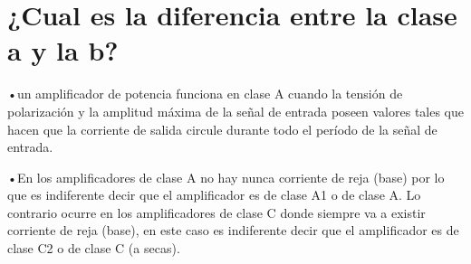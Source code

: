 \documentclass[12pt,a4paper]{article}
\begin{document}
\chapter{¿Cual es la diferencia entre la clase  a y la b?}
\begin{flushleft}
•un amplificador de potencia funciona en clase A cuando la tensión de polarización y la amplitud máxima de la señal de entrada poseen valores tales que hacen que la corriente de salida circule durante todo el período de la señal de entrada.
\end{flushleft}
\begin{flushleft}
•En los amplificadores de clase A no hay nunca corriente de reja (base) por lo que es indiferente decir que el amplificador es de clase A1 o de clase A. Lo contrario ocurre en los amplificadores de clase C donde siempre va a existir corriente de reja (base), en este caso es indiferente decir que el amplificador es de clase C2 o de clase C (a secas).
\end{flushleft}
\end{document}
